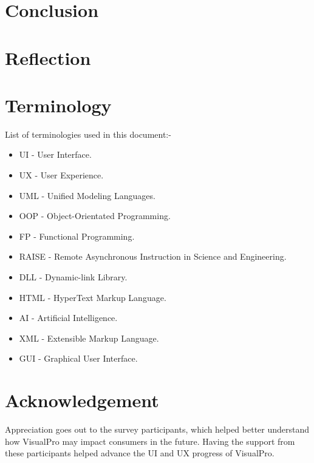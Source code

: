 \documentclass[12pt]{report} %
\begin{document}
	\chapter{Conclusion}

	\chapter{Reflection}

	\chapter{Terminology}
		List of terminologies used in this document:-
		\begin{itemize}
		\item UI - User Interface.
		\item UX - User Experience.
		\item UML - Unified Modeling Languages.
		\item OOP - Object-Orientated Programming.
		\item FP - Functional Programming.
		\item RAISE - Remote Asynchronous Instruction in Science and Engineering.
		\item DLL - Dynamic-link Library.
		\item HTML - HyperText Markup Language.
		\item AI - Artificial Intelligence.
		\item XML - Extensible Markup Language.
		\item GUI - Graphical User Interface.
		\end{itemize}

	\chapter*{Acknowledgement}
		Appreciation goes out to the survey participants, which helped better understand how VisualPro may impact consumers in the future. Having the support from these participants helped advance the UI and UX progress of VisualPro.

\clearpage
\nocite{*}
\small{
}


\end{document}
